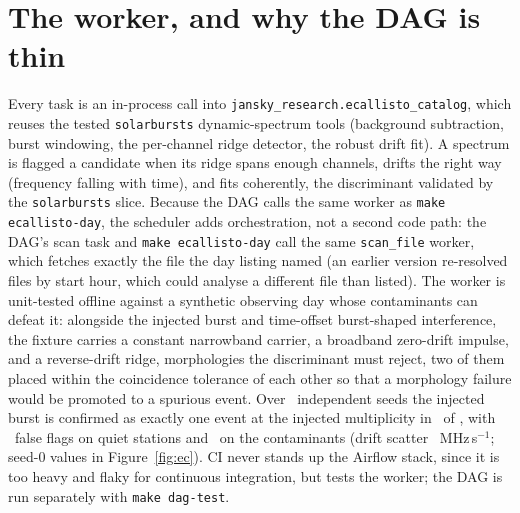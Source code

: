 \documentclass[twocolumn]{aastex631}
\newcommand{\code}[1]{\texttt{#1}}
\begin{document}
\section{The worker, and why the DAG is thin}
Every task is an in-process call into \code{jansky\_research.ecallisto\_catalog}, which reuses the tested
\code{solarbursts} dynamic-spectrum tools (background subtraction, burst windowing, the per-channel ridge
detector, the robust drift fit). A spectrum is flagged a candidate when its ridge spans enough channels,
drifts the right way (frequency falling with time), and fits coherently, the discriminant validated by
the \code{solarbursts} slice. Because the DAG calls the same worker as \code{make ecallisto-day},
the scheduler adds orchestration, not a second code path: the DAG's scan task and
\code{make ecallisto-day} call the same \code{scan\_file} worker, which fetches exactly the file
the day listing named (an earlier version re-resolved files by start hour, which could analyse a
different file than listed). The worker is unit-tested offline against a synthetic observing day
whose contaminants can defeat it: alongside the injected burst and time-offset burst-shaped
interference, the fixture carries a constant narrowband carrier, a broadband zero-drift impulse, and a reverse-drift ridge, morphologies the discriminant must reject, two of them placed within
the coincidence tolerance of each other so that a morphology failure would be promoted to a
spurious event. Over \ecSynEnsN\ independent seeds the injected burst is confirmed as exactly one
event at the injected multiplicity in \ecSynEnsOk\ of \ecSynEnsN, with \ecSynEnsQuietFP\
false flags on quiet stations and \ecSynEnsContFP\ on the contaminants (drift scatter
\ecSynEnsDriftSd~MHz\,s$^{-1}$; seed-0 values in Figure~\ref{fig:ec}). CI never stands up the
Airflow stack, since it is too heavy and flaky for continuous integration, but tests the worker;
the DAG is run separately with \code{make dag-test}.
\end{document}
